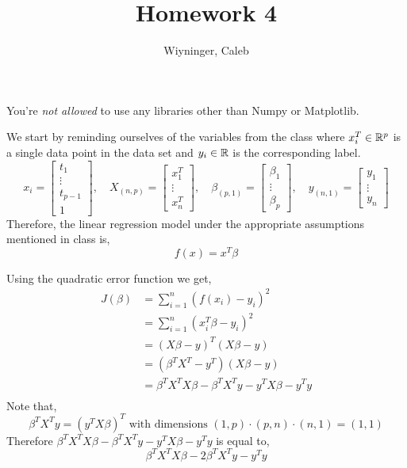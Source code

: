 \documentclass{homework}
\author{Wiyninger, Caleb}  %
\title{Homework 4}
\begin{document}
 \maketitle

You're \textit{not allowed} to use any libraries other than Numpy or
Matplotlib.

We start by reminding ourselves of the variables from the class where
$x_i^T \in \mathbb{R}^p$ is a single data point in the data set and
$y_i\in \mathbb{R}$ is the corresponding label.
\[
  x_i =
  \begin{bmatrix}
    t_1 \\ \vdots \\ t_{p-1} \\ 1
  \end{bmatrix},
  \quad
  X_{(n, p)} =
  \begin{bmatrix}
    x^T_1 \\ \vdots \\ x^T_n
  \end{bmatrix},
  \quad
  \beta_{(p, 1)} =
  \begin{bmatrix}
    \beta_1 \\ \vdots \\ \beta_p
  \end{bmatrix},
  \quad
  y_{(n, 1)} =
  \begin{bmatrix}
    y_1 \\ \vdots \\ y_n
  \end{bmatrix}
\]
Therefore, the linear regression model under the appropriate
assumptions mentioned in class is,
\[
  f(x) = x^T\beta
\]

Using the quadratic error function we get,
\begin{align*}
  J(\beta) & = \sum_{i=1}^n(f(x_i) - y_{i})^2                    \\
           & = \sum_{i=1}^n(x_i^T\beta - y_{i})^2                \\
           & = (X\beta - y)^T(X\beta - y)                        \\
           & = (\beta^TX^T - y^T)(X\beta - y)                    \\
           & = \beta^TX^TX\beta - \beta^TX^Ty - y^TX\beta - y^Ty \\
\end{align*}
Note that,
\[
  \beta^TX^Ty = (y^TX\beta)^T
  \text{ with dimensions }
  (1, p) \cdot (p, n) \cdot (n, 1) = (1, 1)
\]
Therefore $ \beta^TX^TX\beta - \beta^TX^Ty - y^TX\beta - y^Ty$ is
equal to,
\[
  \beta^TX^TX\beta - 2\beta^TX^Ty - y^Ty
\]
\end{document}
